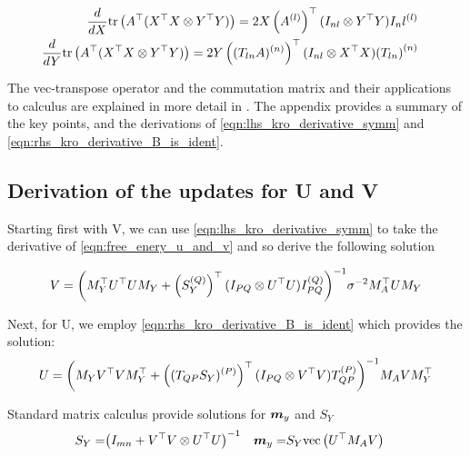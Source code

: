 \begin{align}
\begin{split}
\frac{d}{dX} \text{tr} \left( {A^\top(X^\top X \otimes Y^\top Y)} \right) & = 2X \left({ A^{(l)} }\right)^\top (I_{nl} \otimes Y^\top Y) { I_nl^{(l)} } \label{eqn:lhs_kro_derivative_symm}
\end{split} \\
\begin{split}
\frac{d}{dY} \text{tr} \left( {A^\top(X^\top X \otimes Y^\top Y)} \right) & = 2 Y \left({ (T_{ln} A)^{(n)} }\right)^\top (I_{nl} \otimes X^\top X ) { \left( T_{ln} \right)^{(n)} } \label{eqn:rhs_kro_derivative_B_is_ident}
\end{split}
\end{align}

The vec-transpose operator and the commutation matrix and their applications to calculus are explained in more detail in \cite{Minka2000a}. The appendix provides a summary of the key points, and the derivations of \eqref{eqn:lhs_kro_derivative_symm} and \eqref{eqn:rhs_kro_derivative_B_is_ident}.

\subsection*{Derivation of the updates for U and V}

Starting first with V, we can use \eqref{eqn:lhs_kro_derivative_symm} to take the derivative of \eqref{eqn:free_enery_u_and_v} and so derive the following solution

\begin{equation}
V = {\left( M_Y^\top U^\top U M_Y + \left({ S_Y^{(Q)} }\right)^\top (I_{PQ} \otimes U^\top U) { I_{PQ}^{(Q)} }  \right)}^{-1} \sigma^{-2} M_A ^\top U M_Y
\end{equation}

Next, for U, we employ \eqref{eqn:rhs_kro_derivative_B_is_ident} which provides the solution:
\begin{equation}
U = {\left( M_Y V^\top V M_Y^\top + \left( { (T_{QP} S_Y)^{(P)} } \right)^\top (I_{PQ} \otimes V^\top V){ T_{QP}^{(P)} } \right)}^{-1} M_A V M_Y^\top
\end{equation}

Standard matrix calculus provide solutions for $\bm m_y $ and $S_Y$
\begin{align}
S_Y = & {\left( I_{mn} + V^\top V \otimes U^\top U \right)}^{-1}
& \bm m_y = & S_Y \text{vec}\left(U^\top M_A V\right)
\end{align}


